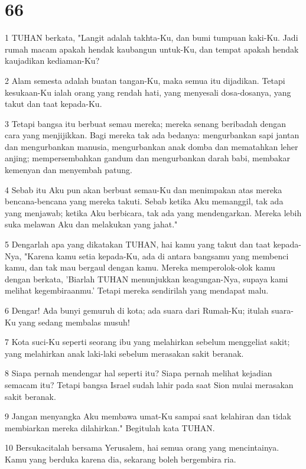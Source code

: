 \chapter{66}

\par 1 TUHAN berkata, "Langit adalah takhta-Ku, dan bumi tumpuan kaki-Ku. Jadi rumah macam apakah hendak kaubangun untuk-Ku, dan tempat apakah hendak kaujadikan kediaman-Ku?
\par 2 Alam semesta adalah buatan tangan-Ku, maka semua itu dijadikan. Tetapi kesukaan-Ku ialah orang yang rendah hati, yang menyesali dosa-dosanya, yang takut dan taat kepada-Ku.
\par 3 Tetapi bangsa itu berbuat semau mereka; mereka senang beribadah dengan cara yang menjijikkan. Bagi mereka tak ada bedanya: mengurbankan sapi jantan dan mengurbankan manusia, mengurbankan anak domba dan mematahkan leher anjing; mempersembahkan gandum dan mengurbankan darah babi, membakar kemenyan dan menyembah patung.
\par 4 Sebab itu Aku pun akan berbuat semau-Ku dan menimpakan atas mereka bencana-bencana yang mereka takuti. Sebab ketika Aku memanggil, tak ada yang menjawab; ketika Aku berbicara, tak ada yang mendengarkan. Mereka lebih suka melawan Aku dan melakukan yang jahat."
\par 5 Dengarlah apa yang dikatakan TUHAN, hai kamu yang takut dan taat kepada-Nya, "Karena kamu setia kepada-Ku, ada di antara bangsamu yang membenci kamu, dan tak mau bergaul dengan kamu. Mereka memperolok-olok kamu dengan berkata, 'Biarlah TUHAN menunjukkan keagungan-Nya, supaya kami melihat kegembiraanmu.' Tetapi mereka sendirilah yang mendapat malu.
\par 6 Dengar! Ada bunyi gemuruh di kota; ada suara dari Rumah-Ku; itulah suara-Ku yang sedang membalas musuh!
\par 7 Kota suci-Ku seperti seorang ibu yang melahirkan sebelum menggeliat sakit; yang melahirkan anak laki-laki sebelum merasakan sakit beranak.
\par 8 Siapa pernah mendengar hal seperti itu? Siapa pernah melihat kejadian semacam itu? Tetapi bangsa Israel sudah lahir pada saat Sion mulai merasakan sakit beranak.
\par 9 Jangan menyangka Aku membawa umat-Ku sampai saat kelahiran dan tidak membiarkan mereka dilahirkan." Begitulah kata TUHAN.
\par 10 Bersukacitalah bersama Yerusalem, hai semua orang yang mencintainya. Kamu yang berduka karena dia, sekarang boleh bergembira ria.
